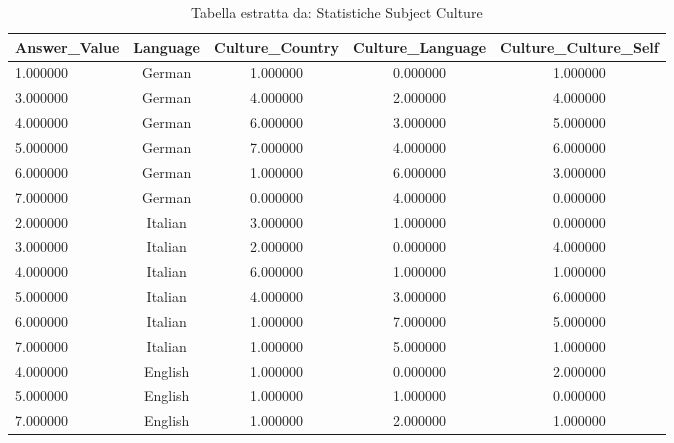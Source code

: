 \begin{table}[htbp]
\caption{Tabella estratta da: Statistiche Subject Culture}
\label{tab:statistiche_subject culture}
\begin{tabular}{lcccc}
\toprule
Answer\_Value & Language & Culture\_Country & Culture\_Language & Culture\_Culture\_Self \\
\midrule
1.000000 & German & 1.000000 & 0.000000 & 1.000000 \\
3.000000 & German & 4.000000 & 2.000000 & 4.000000 \\
4.000000 & German & 6.000000 & 3.000000 & 5.000000 \\
5.000000 & German & 7.000000 & 4.000000 & 6.000000 \\
6.000000 & German & 1.000000 & 6.000000 & 3.000000 \\
7.000000 & German & 0.000000 & 4.000000 & 0.000000 \\
2.000000 & Italian & 3.000000 & 1.000000 & 0.000000 \\
3.000000 & Italian & 2.000000 & 0.000000 & 4.000000 \\
4.000000 & Italian & 6.000000 & 1.000000 & 1.000000 \\
5.000000 & Italian & 4.000000 & 3.000000 & 6.000000 \\
6.000000 & Italian & 1.000000 & 7.000000 & 5.000000 \\
7.000000 & Italian & 1.000000 & 5.000000 & 1.000000 \\
4.000000 & English & 1.000000 & 0.000000 & 2.000000 \\
5.000000 & English & 1.000000 & 1.000000 & 0.000000 \\
7.000000 & English & 1.000000 & 2.000000 & 1.000000 \\
\bottomrule
\end{tabular}
\end{table}
